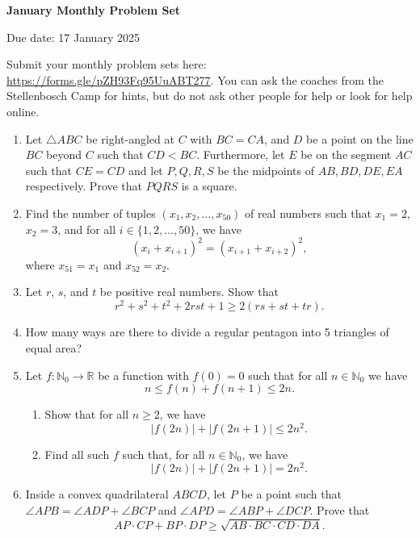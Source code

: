 \documentclass[12pt]{article}
\begin{document}
\begin{center} \bfseries \large
    January Monthly Problem Set

    Due date: 17 January 2025
\end{center}

\bigskip
Submit your monthly problem sets here: \url{https://forms.gle/pZH93Fq95UuABT277}.
You can ask the coaches from the Stellenbosch Camp for hints, but do not ask other people for help or look for help online.

\begin{enumerate}[topsep=\bigskipamount,itemsep=\bigskipamount]
\item %
Let $\triangle{ABC}$ be right-angled at $C$ with $BC= CA$, and $D$ be a point on the line $BC$ beyond $C$ such that $CD < BC$.
Furthermore, let $E$ be on the segment $AC$ such that $CE=CD$ and let $P, Q, R, S$ be the midpoints of $AB, BD, DE, EA$ respectively.
Prove that $PQRS$ is a square.

\item Find the number of tuples $(x_1, x_2, \dots, x_{50})$ of real numbers such that $x_1 = 2$, $x_2 = 3$, and for all $i\in \{1,2,\dots,50\}$, we have
$$(x_i+x_{i+1})^2 = (x_{i+1} + x_{i+2})^2,$$
where $x_{51} = x_{1}$ and $x_{52} = x_{2}$.

\item Let \(r\), \(s\), and \(t\) be positive real numbers. Show that
\[r^{2} + s^{2} + t^{2} + 2rst + 1 \geqslant 2(rs + st + tr).\]

\item 
How many ways are there to divide a regular pentagon into 5 triangles of equal area?

\item Let $f: \mathbb{N}_0 \rightarrow \mathbb{R}$ be a function with $f(0) = 0$ such that for all $n \in \mathbb{N}_0$ we have
$$n \leqslant f(n) + f(n+1) \leqslant 2n.$$
\begin{enumerate}[itemsep=0pt]
    \item Show that for all $n \geqslant 2$, we have
    $$|f(2n)| + |f(2n+1)| \leqslant 2n^2.$$
    \item Find all such $f$ such that, for all $n \in \mathbb{N}_{0}$, we have $$|f(2n)| + |f(2n+1)| = 2n^2.$$
\end{enumerate}


\item %
Inside a convex quadrilateral $ABCD$, let $P$ be a point such that $\angle APB=\angle ADP+\angle BCP$ and $\angle APD=\angle ABP+\angle DCP$.
Prove that $$AP\cdot CP+BP\cdot DP \geqslant \sqrt{AB\cdot BC\cdot CD\cdot DA}.$$


\end{enumerate}
\end{document}

